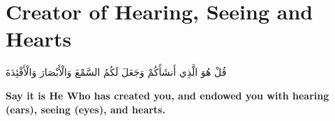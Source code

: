 \chapter{Creator of Hearing, Seeing and Hearts}
\begin{center}
    {\Huge    
        \begin{Arabic}
            قُلْ هُوَ الَّذِي أَنشَأَكُمْ وَجَعَلَ لَكُمُ السَّمْعَ وَالْأَبْصَارَ وَالْأَفْئِدَةَ
        \end{Arabic}
    }
\end{center}
\vspace*{\fill}
\vspace{3cm}
\begin{center}
    \large \textbf{Say it is He Who has created you, and endowed you with hearing (ears), seeing (eyes), and hearts.}
\end{center}
